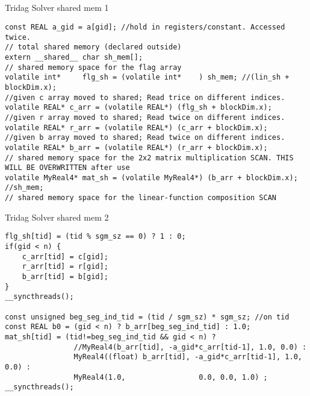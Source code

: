 \documentclass[xcolor=x11names,compress]{beamer}
\begin{document}
\subsection{}
\begin{frame}[fragile]{Tridag Solver shared mem 1}
\begin{verbatim}
const REAL a_gid = a[gid]; //hold in registers/constant. Accessed twice.
// total shared memory (declared outside)
extern __shared__ char sh_mem[];
// shared memory space for the flag array
volatile int*     flg_sh = (volatile int*    ) sh_mem; //(lin_sh + blockDim.x);
//given c array moved to shared; Read trice on different indices.
volatile REAL* c_arr = (volatile REAL*) (flg_sh + blockDim.x);
//given r array moved to shared; Read twice on different indices.
volatile REAL* r_arr = (volatile REAL*) (c_arr + blockDim.x);
//given b array moved to shared; Read twice on different indices.
volatile REAL* b_arr = (volatile REAL*) (r_arr + blockDim.x);
// shared memory space for the 2x2 matrix multiplication SCAN. THIS WILL BE OVERWRITTEN after use
volatile MyReal4* mat_sh = (volatile MyReal4*) (b_arr + blockDim.x); //sh_mem;
// shared memory space for the linear-function composition SCAN    
\end{verbatim}
\end{frame}

\begin{frame}[fragile]{Tridag Solver shared mem 2}
\begin{verbatim}
flg_sh[tid] = (tid % sgm_sz == 0) ? 1 : 0;
if(gid < n) {
    c_arr[tid] = c[gid];
    r_arr[tid] = r[gid];
    b_arr[tid] = b[gid];
}
__syncthreads();

const unsigned beg_seg_ind_tid = (tid / sgm_sz) * sgm_sz; //on tid 
const REAL b0 = (gid < n) ? b_arr[beg_seg_ind_tid] : 1.0;
mat_sh[tid] = (tid!=beg_seg_ind_tid && gid < n) ?
                //MyReal4(b_arr[tid], -a_gid*c_arr[tid-1], 1.0, 0.0) :
                MyReal4((float) b_arr[tid], -a_gid*c_arr[tid-1], 1.0, 0.0) :
                MyReal4(1.0,                 0.0, 0.0, 1.0) ;
__syncthreads();
\end{verbatim}
\end{frame}
\end{document}
